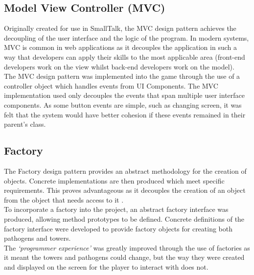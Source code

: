 \documentclass[a4paper,12pt]{article}
\begin{document}
\subsection*{Model View Controller (MVC)}
Originally created for use in SmallTalk, the MVC design pattern achieves the decoupling of the user interface and the logic of the program. In modern systems, MVC is common in web applications as it decouples the application in such a way that developers can apply their skills to the most applicable area (front-end developers work on the view whilst back-end developers work on the model). 
\\
The MVC design pattern was implemented into the game through the use of a controller object which handles events from UI Components. The MVC implementation used only decouples the events that span multiple user interface components. As some button events are simple, such as changing screen, it was felt that the system would have better cohesion if these events remained in their parent's class. 

\subsection*{Factory}
The Factory design pattern provides an abstract methodology for the creation of objects. Concrete implementations are then produced which meet specific requirements. This proves advantageous as it decouples the creation of an object from the object that needs access to it \cite{GoF-Book}.
\\
To incorporate a factory into the project, an abstract factory interface was produced, allowing method prototypes to be defined. Concrete definitions of the factory interface were developed to provide factory objects for creating both pathogens and towers. 
\\
The \textit{`programmer experience'} was greatly improved through the use of factories as it meant the towers and pathogens could change, but the way they were created and displayed on the screen for the player to interact with does not. 
\end{document}
